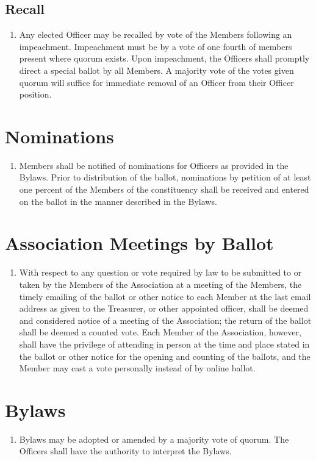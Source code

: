 \subsection{Recall}
\begin{enumerate}
	\item Any elected Officer may be recalled by vote of the Members following an impeachment. Impeachment must be by a vote of one fourth of members present where quorum exists. Upon impeachment, the Officers shall promptly direct a special ballot by all Members. A majority vote of the votes given quorum will suffice for immediate removal of an Officer from their Officer position.
\end{enumerate}

\section{Nominations}
\begin{enumerate}
	\item Members shall be notified of nominations for Officers as provided in the Bylaws. Prior to distribution of the ballot, nominations by petition of at least one percent of the Members of the constituency shall be received and entered on the ballot in the manner described in the Bylaws.
\end{enumerate}

\section{Association Meetings by Ballot}
\begin{enumerate}
	\item With respect to any question or vote required by law to be submitted to or taken by the Members of the Association at a meeting of the Members, the timely emailing of the ballot or other notice to each Member at the last email address as given to the Treasurer, or other appointed officer, shall be deemed and considered notice of a meeting of the Association; the return of the ballot shall be deemed a counted vote. Each Member of the Association, however, shall have the privilege of attending in person at the time and place stated in the ballot or other notice for the opening and counting of the ballots, and the Member may cast a vote personally instead of by online ballot.
\end{enumerate}

\section{Bylaws}
\begin{enumerate}
	\item Bylaws may be adopted or amended by a majority vote of quorum. The Officers shall have the authority to interpret the Bylaws.
\end{enumerate}

